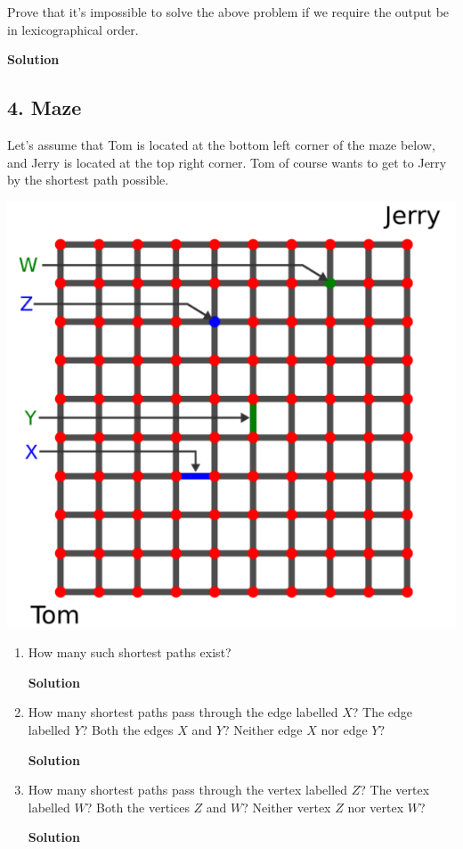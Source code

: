 \documentclass{article}\usepackage{amsmath,amssymb,amsthm,tikz,tkz-graph,color,chngpage,soul,hyperref,csquotes,graphicx,floatrow}\newcommand*{\QEDB}{\hfill\ensuremath{\square}}\newtheorem*{prop}{Proposition}\renewcommand{\theenumi}{\alph{enumi}}\usepackage[shortlabels]{enumitem}\usepackage[nobreak=true]{mdframed}\usetikzlibrary{matrix,calc}\MakeOuterQuote{"}\usepackage[margin=0.75in]{geometry} \newtheorem{theorem}{Theorem}
\begin{document}
\noindent Prove that it's impossible to solve the above problem if we require the output be in lexicographical order.
\begin{mdframed}
\textbf{Solution}

\end{mdframed}
\clearpage

\subsection*{4. Maze}
Let's assume that Tom is located at the bottom left corner of the maze below, and Jerry is located at the top right corner. Tom of course wants to get to Jerry by the shortest path possible.
\begin{center}
\includegraphics[scale=0.3]{graph}
\end{center}
\begin{enumerate}
\item How many such shortest paths exist?
\begin{mdframed}
\textbf{Solution}

\end{mdframed}
\item How many shortest paths pass through the edge labelled $X$? The edge labelled $Y$? Both the edges $X$ and $Y$? Neither edge $X$ nor edge $Y$?
\begin{mdframed}
\textbf{Solution}

\end{mdframed}
\item How many shortest paths pass through the vertex labelled $Z$? The vertex labelled $W$? Both the vertices $Z$ and $W$? Neither vertex $Z$ nor vertex $W$?
\begin{mdframed}
\textbf{Solution}

\end{mdframed}
\end{enumerate}
\clearpage
\end{document}
